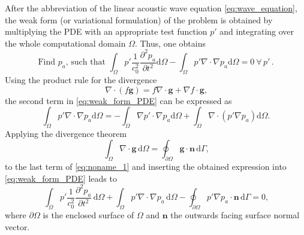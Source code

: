 After the abbreviation of the linear acoustic wave equation \cref{eq:wave_equation}, the weak form (or variational formulation) of the problem is obtained by multiplying the PDE with an appropriate test function $p'$ and integrating over the whole computational domain $\Omega$. Thus, one obtains
\begin{equation}
    \text{Find } p_a \text{, such that }\int_{\Omega}p'\frac{1}{c_0^2}\frac{\partial^2 p_a}{\partial t^2}\text{d}\Omega - \int_{\Omega}p'\nabla\cdot\nabla p_a\text{d}\Omega = 0\ \forall\,p'\,. \label{eq:weak_form_PDE}
\end{equation}
Using the product rule for the divergence
\begin{equation}
	\nabla\cdot(f\boldsymbol{g}) = f\nabla\cdot\boldsymbol{g} + \nabla f \cdot \boldsymbol{g}\text{,}
\end{equation}
the second term in \cref{eq:weak_form_PDE} can be expressed as
\begin{equation}
	\int_{\Omega}p'\nabla\cdot\nabla p_a\text{d}\Omega = - \int_{\Omega}\nabla p'\cdot\nabla p_a\text{d}\Omega + \int_{\Omega}\nabla\cdot(p'\nabla p_a)\text{d}\Omega \text{.} \label{eq:noname_1}
\end{equation}
Applying the divergence theorem \cite{kreyszig_advanced, wiley_mathematics_1995}
\begin{equation}
	\int_{\Omega} \nabla\cdot \boldsymbol{g}\,\text{d}\Omega = \oint_{\partial \Omega} \boldsymbol{g}\cdot\boldsymbol{n}\,\text{d}\Gamma \text{,}
\end{equation}
to the last term of \cref{eq:noname_1} and inserting the obtained expression into \cref{eq:weak_form_PDE} leads to
\begin{equation}
	\int_{\Omega}p'\frac{1}{c_0^2}\frac{\partial^2 p_a}{\partial t^2}\,\text{d}\Omega + \int_{\Omega}p'\nabla\cdot\nabla p_a\,\text{d}\Omega - \oint_{\partial\Omega} p'\nabla p_a \cdot \boldsymbol{n}\,\text{d}\Gamma = 0\text{,} \label{eq:noname_2}
\end{equation}
where $\partial \Omega$ is the enclosed surface of $\Omega$ and $\boldsymbol{n}$ the outwards facing surface normal vector.

